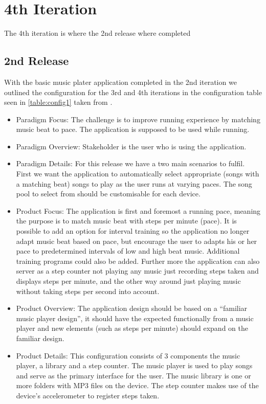 \section{4th Iteration}
The 4th iteration is where the 2nd release where completed 

\subsection{2nd Release}
With the basic music plater application completed in the 2nd iteration we outlined the configuration for the 3rd and 4th iterations in the configuration table seen in \ref{table:config1} taken from \citet{essence:config}.




\begin{itemize}
\item Paradigm Focus: The challenge is to improve running experience by matching music beat to pace. The application is supposed to be used while running.
\item Paradigm Overview: Stakeholder is the user who is using the application.
\item Paradigm Details: For this release we have a two main scenarios to fulfil. First we want the application to automatically select appropriate (songs with a matching beat) songs to play as the user runs at varying paces. The song pool to select from should be customisable for each device.
\item Product Focus: The application is first and foremost a running pace, meaning the purpose is to match music beat with steps per minute (pace). It is possible to add an option for interval training so the application no longer adapt music beat based on pace, but encourage the user to adapts his or her pace to predetermined intervals of low and high beat music. Additional training programs could also be added. Further more the application can also server as a step counter not playing any music just recording steps taken and displays steps per minute, and the other way around just playing music without taking steps per second into account.
\item Product Overview: The application design should be based on a ``familiar music player design'', it should have the expected functionally from a music player and new elements (such as steps per minute) should expand on the familiar design. 
\item Product Details: This configuration consists of 3 components the music player, a library and a step counter. The music player is used to play songs and serve as the primary interface for the user. The music library is one or more folders with MP3 files on the device. The step counter makes use of the device's accelerometer to register steps taken.

\end{itemize}
